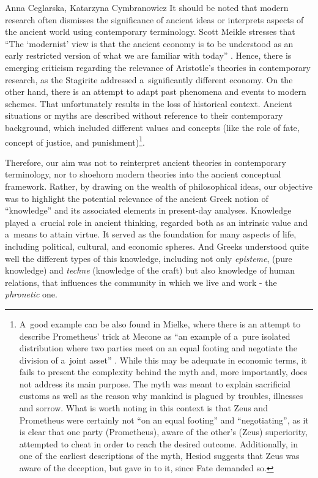 \begin{artengenv2auth}{Anna Ceglarska, Katarzyna Cymbranowicz}
It should be noted that modern research often dismisses the significance of ancient ideas or interprets aspects of the ancient world using contemporary terminology. Scott Meikle stresses that ``The ‘modernist' view is that the ancient economy is to be understood as an early restricted version of what we are familiar with today'' 
\parencite[][p.2]{meikle_aristotles_1995}. %
 Hence, there is emerging criticism regarding the relevance of Aristotle's theories in contemporary research, as the Stagirite addressed a~significantly different economy. On the other hand, there is an attempt to adapt past phenomena and events to modern schemes. That unfortunately results in the loss of historical context. Ancient situations or myths are described without reference to their contemporary background, which included different values and concepts (like the role of fate, concept of justice, and punishment)\footnote{A~good example can be also found in Mielke, where there is an attempt to describe Prometheus' trick at Mecone as ``an example of a~pure isolated distribution where two parties meet on an equal footing and negotiate the division of a~joint asset'' 
\parencite[][p.178]{meikle_aristotles_1995}. %
 While this may be adequate in economic terms, it fails to present the complexity behind the myth and, more importantly, does not address its main purpose. The myth was meant to explain sacrificial customs as well as the reason why mankind is plagued by troubles, illnesses and sorrow. What is worth noting in this context is that Zeus and Prometheus were certainly not ``on an equal footing'' and ``negotiating'', as it is clear that one party (Prometheus), aware of the other's (Zeus) superiority, attempted to cheat in order to reach the desired outcome. Additionally, in one of the earliest descriptions of the myth, Hesiod suggests that Zeus was aware of the deception, but gave in to it, since Fate demanded so.}.



Therefore, our aim was not to reinterpret ancient theories in contemporary terminology, nor to shoehorn modern theories into the ancient conceptual framework. Rather, by drawing on the wealth of philosophical ideas, our objective was to highlight the potential relevance of the ancient Greek notion of ``knowledge'' and its associated elements in present-day analyses. Knowledge played a~crucial role in ancient thinking, regarded both as an intrinsic value and a~means to attain virtue. It served as the foundation for many aspects of life, including political, cultural, and economic spheres. And Greeks understood quite well the different types of this knowledge, including not only \textit{episteme}, (pure knowledge) and \textit{techne} (knowledge of the craft) but also knowledge of human relations, that influences the community in which we live and work - the \textit{phronetic} one.




\end{artengenv2auth}
